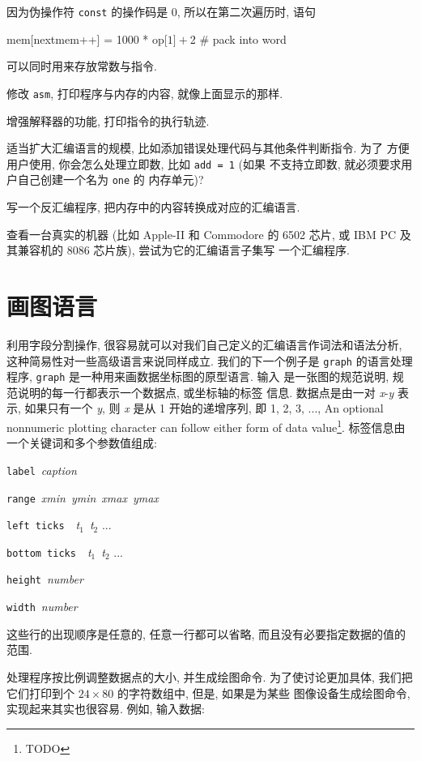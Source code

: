 因为伪操作符 \texttt{const} 的操作码是 0, 所以在第二次遍历时, 语句
\begin{awkcode}
    mem[nextmem++] = 1000 * op[$1] + $2  # pack into word
\end{awkcode}
可以同时用来存放常数与指令.

\begin{exercise}
    修改 \texttt{asm}, 打印程序与内存的内容, 就像上面显示的那样.
\end{exercise}

\begin{exercise}
    增强解释器的功能, 打印指令的执行轨迹.
\end{exercise}

\begin{exercise}
    适当扩大汇编语言的规模, 比如添加错误处理代码与其他条件判断指令. 为了 
    方便用户使用, 你会怎么处理立即数, 比如 \texttt{add = 1} (如果 
    不支持立即数, 就必须要求用户自己创建一个名为 \texttt{one} 的
    内存单元)?
\end{exercise}

\begin{exercise}
    写一个反汇编程序, 把内存中的内容转换成对应的汇编语言.
\end{exercise}

\begin{exercise}
    查看一台真实的机器 (比如 Apple-II 和 Commodore 的 6502 芯片, 或
    IBM PC 及其兼容机的 8086 芯片族), 尝试为它的汇编语言子集写
    一个汇编程序.
\end{exercise}

\section{画图语言}
\label{sec:a_language_for_drawing_graphs}

利用字段分割操作, 很容易就可以对我们自己定义的汇编语言作词法和语法分析,
这种简易性对一些高级语言来说同样成立. 我们的下一个例子是 \texttt{graph} 
的语言处理程序, \texttt{graph} 是一种用来画数据坐标图的原型语言. 输入
是一张图的规范说明, 规范说明的每一行都表示一个数据点, 或坐标轴的标签
信息. 数据点是由一对 \textit{x}-\textit{y} 表示, 如果只有一个 \textit{y},
则 \textit{x} 是从 1 开始的递增序列, 即 1, 2, 3, ..., 
An optional nonnumeric plotting character can follow either form of data
value\footnote{TODO}. 标签信息由一个关键词和多个参数值组成:
\begin{pattern}
\indent\texttt{label}\ \textit{caption} \par
\indent\texttt{range}\ \textit{xmin}\ \textit{ymin}\ \textit{xmax}\
    \textit{ymax} \par 
\indent\texttt{left ticks}\ \ \textit{t}$_1$\ \textit{t}$_2$ ... \par 
\indent\texttt{bottom ticks}\ \ \textit{t}$_1$\ \textit{t}$_2$ ... \par 
\indent\texttt{height}\ \textit{number}\par
\indent\texttt{width}\ \textit{number}\par
\end{pattern}
这些行的出现顺序是任意的, 任意一行都可以省略, 而且没有必要指定数据的值的
范围.

处理程序按比例调整数据点的大小, 并生成绘图命令. 为了使讨论更加具体,
我们把它们打印到个 $24 \times 80$ 的字符数组中, 但是, 如果是为某些
图像设备生成绘图命令, 实现起来其实也很容易. 例如, 输入数据:
